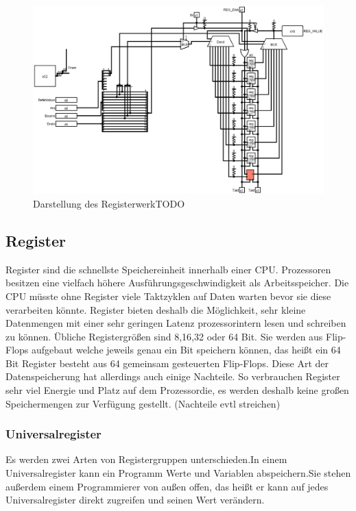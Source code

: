 \documentclass[12pt]{article}
\begin{document}
\begin{figure}[!htb]
\includegraphics[scale=0.40]{circ}
\caption{Darstellung des RegisterwerkTODO}
\centering
\label{fig:register}
\end{figure}

\subsection{Register}
Register sind die schnellste Speichereinheit innerhalb einer CPU. Prozessoren besitzen eine vielfach höhere Ausführungsgeschwindigkeit als Arbeitsspeicher. Die CPU müsste ohne Register viele Taktzyklen auf Daten warten bevor sie diese verarbeiten könnte. Register bieten deshalb die Möglichkeit, sehr kleine Datenmengen mit einer sehr geringen Latenz prozessorintern lesen und schreiben zu können. Übliche Registergrößen sind 8,16,32 oder 64 Bit.\cite{mikroprozessortechnik2011} Sie werden aus Flip-Flops aufgebaut welche jeweils genau ein Bit speichern können, das heißt ein 64 Bit Register besteht aus 64 gemeinsam gesteuerten Flip-Flops.\cite{mikroprozessortechnik2011} Diese Art der Datenspeicherung hat allerdings auch einige Nachteile. So verbrauchen Register sehr viel Energie und Platz auf dem Prozessordie, es werden deshalb keine großen Speichermengen zur Verfügung gestellt. (Nachteile evtl streichen)

\subsubsection{Universalregister}
Es werden zwei Arten von Registergruppen unterschieden.In einem Universalregister kann ein Programm Werte und Variablen abspeichern.Sie stehen außerdem einem Programmierer von außen offen, das heißt er kann auf jedes Universalregister direkt zugreifen und seinen Wert verändern.
\end{document}
